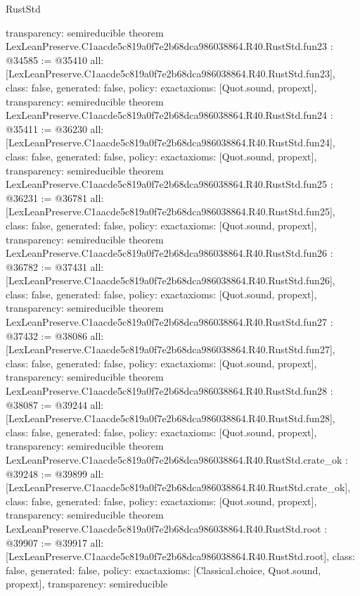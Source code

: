 \begin{lexlean}{RustStd}
\begin{coremodule}
{  transparency: semireducible
}
theorem LexLeanPreserve.C1aacde5c819a0f7e2b68dca986038864.R40.RustStd.fun23 : @34585 := @35410 {
  all: [LexLeanPreserve.C1aacde5c819a0f7e2b68dca986038864.R40.RustStd.fun23],
  class: false,
  generated: false,
  policy: exact{axioms: [Quot.sound, propext]},
  transparency: semireducible
}
theorem LexLeanPreserve.C1aacde5c819a0f7e2b68dca986038864.R40.RustStd.fun24 : @35411 := @36230 {
  all: [LexLeanPreserve.C1aacde5c819a0f7e2b68dca986038864.R40.RustStd.fun24],
  class: false,
  generated: false,
  policy: exact{axioms: [Quot.sound, propext]},
  transparency: semireducible
}
theorem LexLeanPreserve.C1aacde5c819a0f7e2b68dca986038864.R40.RustStd.fun25 : @36231 := @36781 {
  all: [LexLeanPreserve.C1aacde5c819a0f7e2b68dca986038864.R40.RustStd.fun25],
  class: false,
  generated: false,
  policy: exact{axioms: [Quot.sound, propext]},
  transparency: semireducible
}
theorem LexLeanPreserve.C1aacde5c819a0f7e2b68dca986038864.R40.RustStd.fun26 : @36782 := @37431 {
  all: [LexLeanPreserve.C1aacde5c819a0f7e2b68dca986038864.R40.RustStd.fun26],
  class: false,
  generated: false,
  policy: exact{axioms: [Quot.sound, propext]},
  transparency: semireducible
}
theorem LexLeanPreserve.C1aacde5c819a0f7e2b68dca986038864.R40.RustStd.fun27 : @37432 := @38086 {
  all: [LexLeanPreserve.C1aacde5c819a0f7e2b68dca986038864.R40.RustStd.fun27],
  class: false,
  generated: false,
  policy: exact{axioms: [Quot.sound, propext]},
  transparency: semireducible
}
theorem LexLeanPreserve.C1aacde5c819a0f7e2b68dca986038864.R40.RustStd.fun28 : @38087 := @39244 {
  all: [LexLeanPreserve.C1aacde5c819a0f7e2b68dca986038864.R40.RustStd.fun28],
  class: false,
  generated: false,
  policy: exact{axioms: [Quot.sound, propext]},
  transparency: semireducible
}
theorem LexLeanPreserve.C1aacde5c819a0f7e2b68dca986038864.R40.RustStd.crate_ok : @39248 := @39899 {
  all: [LexLeanPreserve.C1aacde5c819a0f7e2b68dca986038864.R40.RustStd.crate_ok],
  class: false,
  generated: false,
  policy: exact{axioms: [Quot.sound, propext]},
  transparency: semireducible
}
theorem LexLeanPreserve.C1aacde5c819a0f7e2b68dca986038864.R40.RustStd.root : @39907 := @39917 {
  all: [LexLeanPreserve.C1aacde5c819a0f7e2b68dca986038864.R40.RustStd.root],
  class: false,
  generated: false,
  policy: exact{axioms: [Classical.choice, Quot.sound, propext]},
  transparency: semireducible
}


\end{coremodule}
\end{lexlean}
